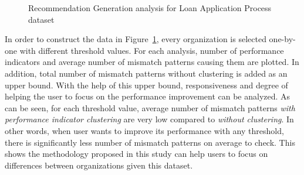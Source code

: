 \begin{itemize}
\begin{figure}
    	\caption{Recommendation Generation analysis for Loan Application Process dataset}
      \label{fig:loan-recommendation-generation-analysis}
    \end{figure}
  In order to construct the data in Figure~\ref{fig:loan-recommendation-generation-analysis}, every organization is selected one-by-one with different threshold values. For each analysis, number of performance indicators and average number of mismatch patterns causing them are plotted. In addition, total number of mismatch patterns without clustering is added as an upper bound. With the help of this upper bound, responsiveness and degree of helping the user to focus on the performance improvement can be analyzed. As can be seen, for each threshold value, average number of mismatch patterns \textit{with performance indicator clustering} are very low compared to \textit{without clustering}. In other words, when user wants to improve its performance with any threshold, there is significantly less number of mismatch patterns on average to check. This shows the methodology proposed in this study can help users to focus on differences between organizations given this dataset.
\end{itemize}